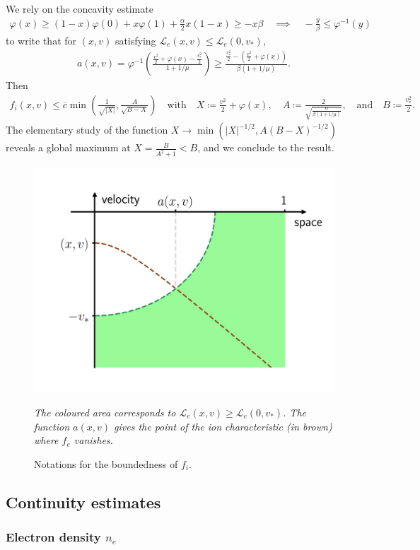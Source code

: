 \documentclass{article}
\numberwithin{equation}{section}
\newcommand{\mysubcaption}[1]{
	\vspace*{5pt}
	\begin{minipage}{0.8\linewidth}
		\begin{center}
			\footnotesize\emph{#1}
		\end{center}
	\end{minipage}
}
\newcommand{\maxfe}{{\overline{c}}} %
\begin{document}
{	We rely on the concavity estimate
	\begin{align*}
		\varphi(x) \geqslant (1 - x) \varphi(0) + x \varphi(1) + \frac{\alpha}{2} x(1-x) \geqslant - x \beta 
		\quad \implies \quad
		-\frac{y}{\beta} \leqslant \varphi^{-1}(y)
	\end{align*}
	to write that for $(x,v)$ satisfying $\mathcal{L}_e(x,v) \leqslant \mathcal{L}_e(0,v_*)$, 
	\begin{align*}
		a(x,v) = \varphi^{-1}\left(\frac{\frac{v^2}{2} + \varphi(x) - \frac{v_*^2}{2}}{1+1/\mu}\right)
		\geqslant \frac{\frac{v_*^2}{2} - (\frac{v^2}{2} + \varphi(x))}{\beta(1+1/\mu)}.
	\end{align*}
	Then 
	\begin{align*}
		f_i(x,v) \leqslant \maxfe \min \left(\frac{1}{\sqrt{|X|}}, \frac{A}{\sqrt{B - X}}\right) 
		\quad \text{with} \quad
		X \coloneqq \frac{v^2}{2} + \varphi(x), \quad A \coloneqq \frac{2}{\sqrt{\frac{\alpha}{\beta(1+1/\mu)}}}, \quad \text{and} \quad B \coloneqq \frac{v_*^2}{2}.
	\end{align*}
	 The elementary study of the function $X \to \min\left(|X|^{-1/2}, A (B-X)^{-1/2}\right)$ reveals a global maximum at $X = \frac{B}{A^2 + 1} < B$, and we conclude to the result.
	 
 	\begin{figure}
 		\centering
 		\includegraphics[width=0.5\linewidth]{images/global_bound_fi}
 		\caption{Notations for the boundedness of $f_i$.}
 		\mysubcaption{The coloured area corresponds to $\mathcal{L}_e(x,v) \geqslant \mathcal{L}_e(0,v_*)$. The function $a(x,v)$ gives the point of the ion characteristic (in brown) where $f_e$ vanishes.}
 		\label{fig:charmaps_domainmap}
 	\end{figure}
}

\subsection{Continuity estimates}

\subsubsection{Electron density $n_e$}
\end{document}
